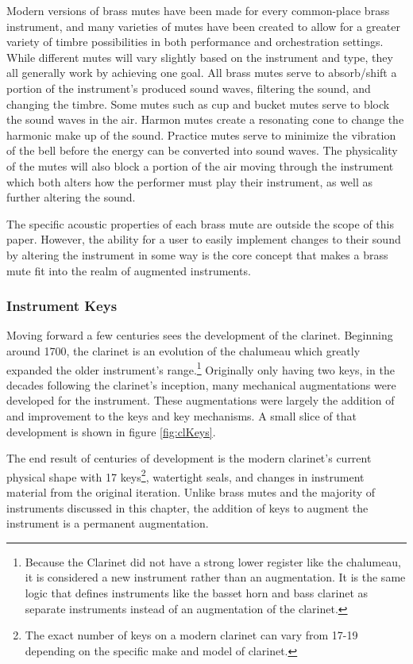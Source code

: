 Modern versions of brass mutes have been made for every common-place brass instrument, and many varieties of mutes have been created to allow for a greater variety of timbre possibilities in both performance and orchestration settings. While different mutes will vary slightly based on the instrument and type, they all generally work by achieving one goal. All brass mutes serve to absorb/shift a portion of the instrument's produced sound waves, filtering the sound, and changing the timbre. Some mutes such as cup and bucket mutes serve to block the sound waves in the air. Harmon mutes create a resonating cone to change the harmonic make up of the sound. Practice mutes serve to minimize the vibration of the bell before the energy can be converted into sound waves. The physicality of the mutes will also block a portion of the air moving through the instrument which both alters how the performer must play their instrument, as well as further altering the sound\cite{brassMutes1982}.

The specific acoustic properties of each brass mute are outside the scope of this paper. However, the ability for a user to easily implement changes to their sound by altering the instrument in some way is the core concept that makes a brass mute fit into the realm of augmented instruments.

\subsubsection{Instrument Keys}

Moving forward a few centuries sees the development of the clarinet. Beginning around 1700, the clarinet is an evolution of the chalumeau which greatly expanded the older instrument's range.\footnote{Because the Clarinet did not have a strong lower register like the chalumeau, it is considered a new instrument rather than an augmentation. It is the same logic that defines instruments like the basset horn and bass clarinet as separate instruments instead of an augmentation of the clarinet.} Originally only having two keys, in the decades following the clarinet's inception, many mechanical augmentations were developed for the instrument. These augmentations were largely the addition of and improvement to the keys and key mechanisms. A small slice of that development is shown in figure \ref{fig:clKeys}. 

The end result of centuries of development is the modern clarinet's current physical shape with 17 keys\footnote{The exact number of keys on a modern clarinet can vary from 17-19 depending on the specific make and model of clarinet.}, watertight seals, and changes in instrument material from the original iteration. Unlike brass mutes and the majority of instruments discussed in this chapter, the addition of keys to augment the instrument is a permanent augmentation. 

